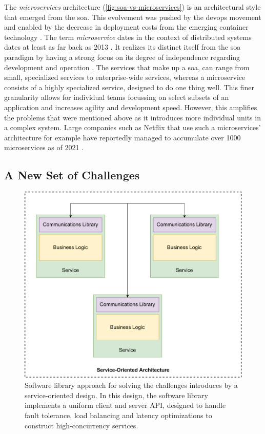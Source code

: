 The \textit{microservices} architecture (\cref{fig:soa-vs-microservices}) is an architectural style that emerged from the \gls{soa}. This evolvement was pushed by the  \gls{devops} movement and enabled by the decrease in deployment costs from the emerging \gls{container} technology \cite{amaral2015performance}.  The term \textit{microservice} dates in the context of distributed systems dates at least as far back as 2013 \cite{fowler-microservices}. It realizes its distinct itself from the \gls{soa}  paradigm by having a strong focus on its degree of independence regarding development and operation \cite{ibm-soa-vs-microservices}. The services that make up a \gls{soa}, can range from small, specialized services to enterprise-wide services, whereas a microservice consists of a highly specialized service, designed to do one thing well. This finer granularity allows for individual teams focussing on select subsets of an application and increases agility and development speed. However, this amplifies the problems that were mentioned above as it introduces more individual units in a complex system. Large companies such as Netflix that use such a microservices' architecture for example have reportedly managed to accumulate over 1000 microservices as of 2021 \cite{netflix-chaos, netflix-svc}.



\subsection{A New Set of Challenges}
\label{sec:background:soa:challenges}



\begin{figure}[!t]
    \centering
    
    \includegraphics[width=.7\linewidth]{2_background/figures/software-lib-approach.pdf}

    \caption{Software library approach for solving the challenges introduces by a service-oriented design. In this design, the software library implements a uniform client and server API, designed to  handle fault tolerance, load balancing and latency optimizations to construct high-concurrency services.}
    \label{fig:software-lib-approach}
\end{figure}


